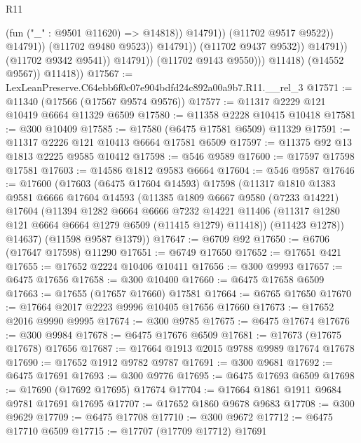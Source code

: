 \begin{lexlean}{R11}
\begin{coremodule}
                                              (fun ("_" : @9501 @11620) => @14818))
                                            @14791))
                                        (@11702 @9517 @9522))
                                      @14791))
                                  (@11702 @9480 @9523))
                                @14791))
                            (@11702 @9437 @9532))
                          @14791))
                      (@11702 @9342 @9541))
                    @14791))
                (@11702 @9143 @9550)))
            @11418)
          (@14552 @9567))
        @11418))
@17567 := LexLeanPreserve.C64ebb6f0c07e904bdfd24c892a00a9b7.R11.__rel_3
@17571 := @11340 (@17566 (@17567 @9574 @9576))
@17577 := @11317 @2229 @121 @10419 @6664 @11329 @6509
@17580 := @11358 @2228 @10415 @10418
@17581 := @300 @10409
@17585 := @17580 (@6475 @17581 @6509) @11329
@17591 := @11317 @2226 @121 @10413 @6664 @17581 @6509
@17597 := @11375 @92 @13 @1813 @2225 @9585 @10412
@17598 := @546 @9589
@17600 := @17597 @17598 @17581
@17603 := @14586 @1812 @9583 @6664
@17604 := @546 @9587
@17646 := @17600
    (@17603
      (@6475 @17604 @14593)
      @17598
      (@11317
        @1810
        @1383
        @9581
        @6666
        @17604
        @14593
        (@11385
          @1809
          @6667
          @9580
          (@7233 @14221)
          @17604
          (@11394
            @1282
            @6664
            @6666
            @7232
            @14221
            @11406
            (@11317 @1280 @121 @6664 @6664 @1279 @6509 (@11415 @1279) @11418))
          (@11423 @1278))
        @14637)
      (@11598 @9587 @1379))
@17647 := @6709 @92
@17650 := @6706 (@17647 @17598) @11290
@17651 := @6749 @17650
@17652 := @17651 @421
@17655 := @17652 @2224 @10406 @10411
@17656 := @300 @9993
@17657 := @6475 @17656
@17658 := @300 @10400
@17660 := @6475 @17658 @6509
@17663 := @17655 (@17657 @17660) @17581
@17664 := @6765 @17650
@17670 := @17664 @2017 @2223 @9996 @10405 @17656 @17660
@17673 := @17652 @2016 @9990 @9995
@17674 := @300 @9785
@17675 := @6475 @17674
@17676 := @300 @9984
@17678 := @6475 @17676 @6509
@17681 := @17673 (@17675 @17678) @17656
@17687 := @17664 @1913 @2015 @9788 @9989 @17674 @17678
@17690 := @17652 @1912 @9782 @9787
@17691 := @300 @9681
@17692 := @6475 @17691
@17693 := @300 @9776
@17695 := @6475 @17693 @6509
@17698 := @17690 (@17692 @17695) @17674
@17704 := @17664 @1861 @1911 @9684 @9781 @17691 @17695
@17707 := @17652 @1860 @9678 @9683
@17708 := @300 @9629
@17709 := @6475 @17708
@17710 := @300 @9672
@17712 := @6475 @17710 @6509
@17715 := @17707 (@17709 @17712) @17691

\end{coremodule}
\end{lexlean}
